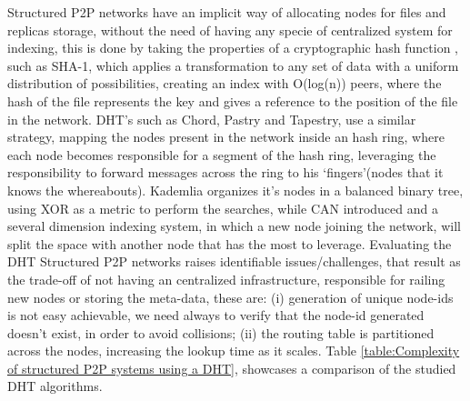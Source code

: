 Structured P2P networks have an implicit way of allocating nodes for files and replicas storage, without the need of having any specie of centralized system for indexing, this is done by taking the properties of a cryptographic hash function \cite{Bakhtiari}\cite{Kargerl}\cite{Preneel1999}, such as SHA-1\cite{D.Eastlake3rdMotorola;P.JonesSystems2001}, which applies a transformation to any set of data with a uniform distribution of possibilities, creating an index with O(log(n)) peers, where the hash of the file represents the key and gives a reference to the position of the file in the network.
DHT's such as Chord\cite{Stoica2001}, Pastry\cite{Rowstron2001} and Tapestry\cite{Zhao2001}, use a similar strategy, mapping the nodes present in the network inside an hash ring, where each node becomes responsible for a segment of the hash ring, leveraging the responsibility to forward messages across the ring to his `fingers'(nodes that it knows the whereabouts). Kademlia\cite{Maymounkov} organizes it's nodes in a balanced binary tree, using XOR as a metric to perform the searches, while CAN\cite{Handley} introduced and a several dimension indexing system, in which a new node joining the network, will split the space with another node that has the most to leverage.
Evaluating the DHT Structured P2P networks raises identifiable issues/challenges, that result as the trade-off of not having an centralized infrastructure, responsible for railing new nodes or storing the meta-data, these are: (i) generation of unique node-ids is not easy achievable, we need always to verify that the node-id generated doesn't exist, in order to avoid collisions; (ii) the routing table is partitioned across the nodes, increasing the lookup time as it scales.
Table \ref{table:Complexity of structured P2P systems using a DHT}, showcases a comparison of the studied DHT algorithms.

